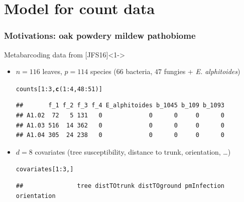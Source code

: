 \documentclass[10pt, c, xcolor=x11names]{beamer}\usepackage[]{graphicx}\usepackage[]{color}
\makeatletter
\newcommand{\hlnum}[1]{\textcolor[rgb]{0.686,0.059,0.569}{#1}}%
\newcommand{\hlopt}[1]{\textcolor[rgb]{0,0,0}{#1}}%
\newcommand{\hlstd}[1]{\textcolor[rgb]{0.345,0.345,0.345}{#1}}%
\newcommand{\hlkwd}[1]{\textcolor[rgb]{0.737,0.353,0.396}{\textbf{#1}}}%
\newenvironment{kframe}{%
 \def\at@end@of@kframe{}%
 \ifinner\ifhmode%
  \def\at@end@of@kframe{\end{minipage}}%
  \begin{minipage}{\columnwidth}%
 \fi\fi%
 \def\FrameCommand##1{\hskip\@totalleftmargin \hskip-\fboxsep
 \colorbox{shadecolor}{##1}\hskip-\fboxsep
     \hskip-\linewidth \hskip-\@totalleftmargin \hskip\columnwidth}%
 \MakeFramed {\advance\hsize-\width
   \@totalleftmargin\z@ \linewidth\hsize
   \@setminipage}}%
 {\par\unskip\endMakeFramed%
 \at@end@of@kframe}
\newenvironment{knitrout}{}{} %
\makeatother
\begin{document}







\section{Model for count data}



\begin{frame}[fragile]
  \frametitle{Motivations: oak powdery mildew pathobiome}

  \begin{block}{Metabarcoding data from [JFS16]}<1->
    \begin{itemize}
    \item $n = 116$ leaves, $p = 114$ species ($66$ bacteria, $47$ fungies + \textit{E. alphitoides})
\begin{knitrout}\scriptsize
{}\color{fgcolor}\begin{kframe}
\begin{alltt}
\hlstd{counts[}\hlnum{1}\hlopt{:}\hlnum{3}\hlstd{,} \hlkwd{c}\hlstd{(}\hlnum{1}\hlopt{:}\hlnum{4}\hlstd{,} \hlnum{48}\hlopt{:}\hlnum{51}\hlstd{)]}
\end{alltt}
\begin{verbatim}
##       f_1 f_2 f_3 f_4 E_alphitoides b_1045 b_109 b_1093
## A1.02  72   5 131   0             0      0     0      0
## A1.03 516  14 362   0             0      0     0      0
## A1.04 305  24 238   0             0      0     0      0
\end{verbatim}
\end{kframe}
\end{knitrout}
    \item $d = 8$ covariates (tree susceptibility, distance to trunk, orientation, \dots)
\begin{knitrout}\scriptsize
{}\color{fgcolor}\begin{kframe}
\begin{alltt}
\hlstd{covariates[}\hlnum{1}\hlopt{:}\hlnum{3}\hlstd{, ]}
\end{alltt}
\begin{verbatim}
##               tree distTOtrunk distTOground pmInfection orientation

\end{verbatim}
\end{kframe}
\end{knitrout}
\end{itemize}
\end{block}
\end{frame}
\end{document}
